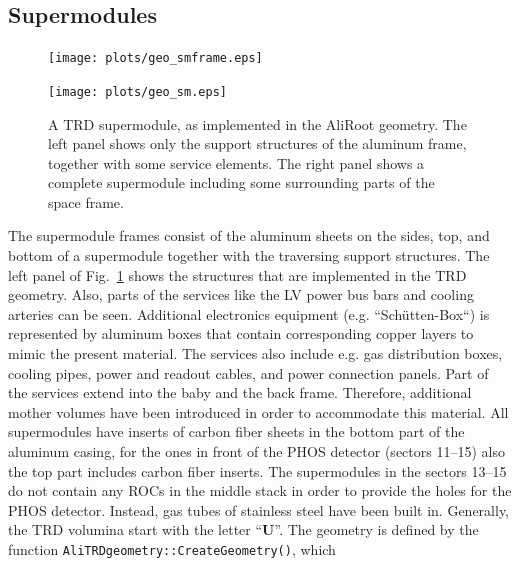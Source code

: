 \documentclass{alicetdr}
\begin{document}
\subsection{Supermodules}
\label{GEO:smframes}
%
\begin{figure}[htb]
\begin{center}
\begin{minipage}[b]{0.49\textwidth}
\begin{center}
\texttt{[image: plots/geo\_smframe.eps]}
\end{center}
\end{minipage}
\begin{minipage}[b]{0.49\textwidth}
\begin{center}
\texttt{[image: plots/geo\_sm.eps]}
\end{center}
\end{minipage}
\end{center}
\caption{
A TRD supermodule, as implemented in the AliRoot geometry.  The left
panel shows only the support structures of the aluminum frame, together
with some service elements.  The right panel shows a complete
supermodule including some surrounding parts of the space frame.
}
\label{FIG_GEO:sm_geom}
\end{figure}
%
The supermodule frames consist of the aluminum sheets on the sides, top,
and bottom of a supermodule together with the traversing support structures.
The left panel of Fig.~\ref{FIG_GEO:sm_geom} shows the structures that are
implemented in the TRD geometry.  Also, parts of the services like the LV
power bus bars and cooling arteries can be seen.  Additional electronics
equipment (e.g. ``Sch\"utten-Box``) is represented by aluminum boxes that
contain corresponding copper layers to mimic the present material.  The
services also include e.g. gas distribution boxes, cooling pipes, power and
readout cables, and power connection panels.  Part of the services extend
into the baby and the back frame.  Therefore, additional mother volumes
have been introduced in order to accommodate this material.  All supermodules
have inserts of carbon fiber sheets in the bottom part of the aluminum
casing, for the ones in front of the PHOS detector (sectors 11--15) also
the top part includes carbon fiber inserts.  The supermodules in the sectors
13--15 do not contain any ROCs in the middle stack in order to provide the
holes for the PHOS detector.  Instead, gas tubes of stainless steel have
been built in.
%
Generally, the TRD volumina start with the letter  ``{\bf U}''.  The geometry
is defined by the function {\tt AliTRDgeometry::CreateGeometry()}, which
\end{document}
